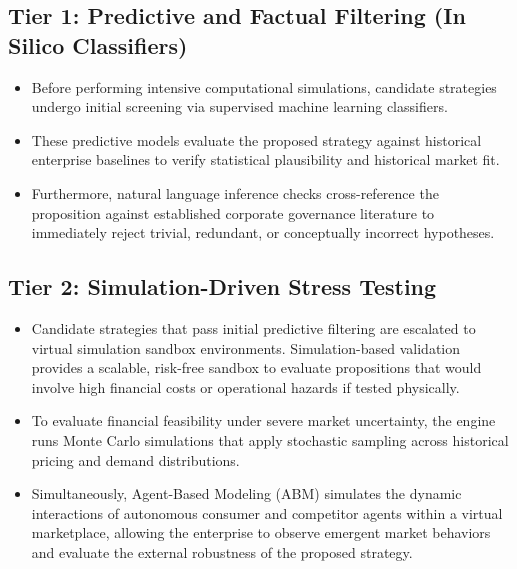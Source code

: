 \documentclass[11pt, a4paper]{article}
\begin{document}
\subsection{Tier 1: Predictive and Factual Filtering (In Silico Classifiers)}
\begin{itemize}[leftmargin=*]
    \item Before performing intensive computational simulations, candidate strategies undergo initial screening via supervised machine learning classifiers.
    
    \item These predictive models evaluate the proposed strategy against historical enterprise baselines to verify statistical plausibility and historical market fit.
    
    \item Furthermore, natural language inference checks cross-reference the proposition against established corporate governance literature to immediately reject trivial, redundant, or conceptually incorrect hypotheses.
\end{itemize}

\subsection{Tier 2: Simulation-Driven Stress Testing}
\begin{itemize}[leftmargin=*]
    \item Candidate strategies that pass initial predictive filtering are escalated to virtual simulation sandbox environments. Simulation-based validation provides a scalable, risk-free sandbox to evaluate propositions that would involve high financial costs or operational hazards if tested physically.
    
    \item To evaluate financial feasibility under severe market uncertainty, the engine runs Monte Carlo simulations that apply stochastic sampling across historical pricing and demand distributions.
    
    \item Simultaneously, Agent-Based Modeling (ABM) simulates the dynamic interactions of autonomous consumer and competitor agents within a virtual marketplace, allowing the enterprise to observe emergent market behaviors and evaluate the external robustness of the proposed strategy.
\end{itemize}
\end{document}
